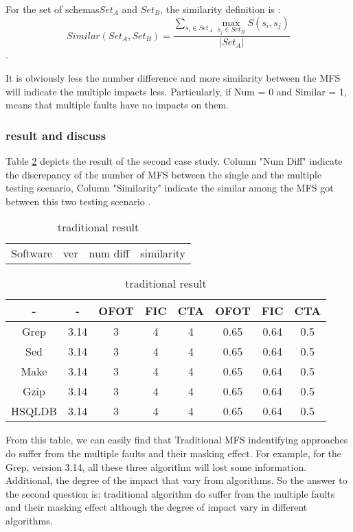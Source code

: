 \documentclass{sig-alternate}
\begin{document}
For the set of schemas$ Set_{A}$ and $Set_{B}$, the similarity definition is :
\begin{displaymath} Similar(Set_{A},Set_{B})= \frac{\sum _{s_{i}\in Set_{A}}\max _{s_{j}\in Set_{B}}S\left( s_{i},s_{j}\right)}{|Set_{A}|} \end{displaymath}.


It is obviously less the number difference and more similarity between the MFS will indicate the multiple impacts less. Particularly, if Num = 0 and Similar = 1, means that multiple faults have no impacts on them.  


\subsubsection{result and discuss}
Table \ref{traiditional_result} depicts the result of the second case study. Column "Num Diff" indicate the discrepancy of the number of MFS between the single and the multiple testing scenario, Column "Similarity" indicate the similar among the MFS got between this two testing scenario .

\begin{table}\renewcommand{\arraystretch}{1.3}
\caption{traditional result}
\label{traiditional_result}
\begin{tabular}{p{}|p{}|p{}|p{}} \hline
   Software & ver  &  num diff & similarity
\end{tabular}

\begin{tabular}{c|c|c|c|c|c|c|c} \hline
- & - & OFOT & FIC & CTA & OFOT & FIC & CTA  \\ \hline
Grep & 3.14 & 3 & 4 & 4 & 0.65 & 0.64&  0.5 \\ \hline
Sed & 3.14 & 3 & 4 & 4 & 0.65 & 0.64&  0.5 \\ \hline
Make & 3.14 & 3 & 4 & 4 & 0.65 & 0.64&  0.5 \\ \hline
Gzip & 3.14 & 3 & 4 & 4 & 0.65 & 0.64&  0.5 \\ \hline
HSQLDB & 3.14 & 3 & 4 & 4 & 0.65 & 0.64&  0.5 \\
\hline\end{tabular}
\end{table}

From this table, we can easily find that Traditional MFS indentifying approaches do suffer from the multiple faults and their masking effect. For example, for the Grep, version 3.14, all these three algorithm will lost some information. Additional, the degree of the impact that vary from algorithms. So the answer to the second question is: traditional algorithm do suffer from the multiple faults and their masking effect although the degree of impact vary in different algorithms.
\end{document}
